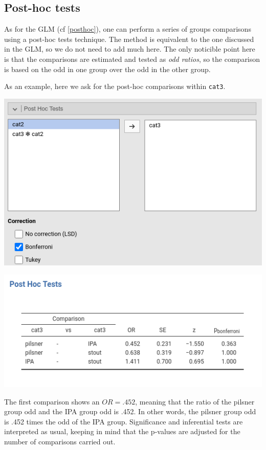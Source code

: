 \documentclass[
]{book}
\begin{document}
\hypertarget{post-hoc-tests}{%
\subsection{Post-hoc tests}\label{post-hoc-tests}}

As for the GLM (cf \ref{posthoc}), one can perform a series of groups comparisons using a post-hoc tests technique. The method is equivalent to the one discussed in the GLM, so we do not need to add much here. The only noticible point here is that the comparisons are estimated and tested as \emph{odd ratios}, so the comparison is based on the odd in one group over the odd in the other group.

As an example, here we ask for the post-hoc comparisons within \texttt{cat3}.

\includegraphics[width=7.78in]{bookletpics/3_logistic_input9}

\includegraphics[width=7.29in]{bookletpics/3_logistic_output12}

The first comparison shows an \(OR=.452\), meaning that the ratio of the pilsner group odd and the IPA group odd is .452. In other words, the pilsner group odd is .452 times the odd of the IPA group. Significance and inferential tests are interpreted as usual, keeping in mind that the p-values are adjusted for the number of comparisons carried out.
\end{document}
